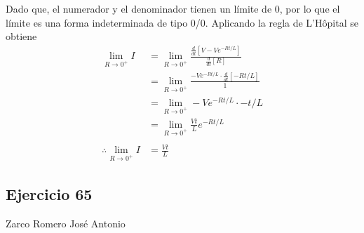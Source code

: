 \documentclass[12pt]{article}
\begin{document}
Dado que, el numerador y el denominador tienen un límite de 0, por lo que el límite es una forma indeterminada de tipo 0/0. Aplicando la regla de L'Hôpital se obtiene
\begin{align*}
  \lim_{R \to 0^+} I
  &= \lim_{R \to 0^+} \frac{\frac{d}{dt}[V-Ve^{-Rt/L}]}{\frac{d}{dt}[R]} \\
  &= \lim_{R \to 0^+} \frac{-Ve^{-Rt/L}\cdot \frac{d}{dt}[-Rt/L]}{1} \\
  &= \lim_{R \to 0^+} -Ve^{-Rt/L}\cdot -t/L \\
  &= \lim_{R \to 0^+} \frac{Vt}{L}e^{-Rt/L} \\ \\
  \therefore
  \lim_{R \to 0^+} I
  &= \frac{Vt}{L}
\end{align*}


\subsection{Ejercicio 65} Zarco Romero José Antonio \\
\end{document}
